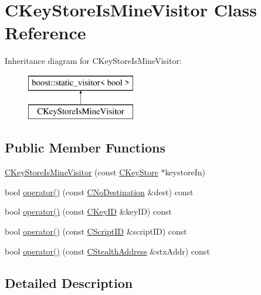 \hypertarget{class_c_key_store_is_mine_visitor}{}\section{C\+Key\+Store\+Is\+Mine\+Visitor Class Reference}
\label{class_c_key_store_is_mine_visitor}
Inheritance diagram for C\+Key\+Store\+Is\+Mine\+Visitor\+:\begin{figure}[H]
\begin{center}
\leavevmode
\includegraphics[height=2.000000cm]{class_c_key_store_is_mine_visitor}
\end{center}
\end{figure}
\subsection*{Public Member Functions}
\begin{DoxyCompactItemize}
\item 
\hyperlink{class_c_key_store_is_mine_visitor_a477146504e2fe72cdae5b135e390583b}{C\+Key\+Store\+Is\+Mine\+Visitor} (const \hyperlink{class_c_key_store}{C\+Key\+Store} $\ast$keystore\+In)
\item 
bool \hyperlink{class_c_key_store_is_mine_visitor_a9fde54444cfd5d2025afc37957632b8a}{operator()} (const \hyperlink{class_c_no_destination}{C\+No\+Destination} \&dest) const 
\item 
bool \hyperlink{class_c_key_store_is_mine_visitor_a0169d971159dd2adf4cc14079c62ad7b}{operator()} (const \hyperlink{class_c_key_i_d}{C\+Key\+I\+D} \&key\+I\+D) const 
\item 
bool \hyperlink{class_c_key_store_is_mine_visitor_a8efa88d2ac5eee13110c0d67546017fa}{operator()} (const \hyperlink{class_c_script_i_d}{C\+Script\+I\+D} \&script\+I\+D) const 
\item 
bool \hyperlink{class_c_key_store_is_mine_visitor_a77417bb4fee971dad7f1f20a778f3858}{operator()} (const \hyperlink{class_c_stealth_address}{C\+Stealth\+Address} \&stx\+Addr) const 
\end{DoxyCompactItemize}


\subsection{Detailed Description}


